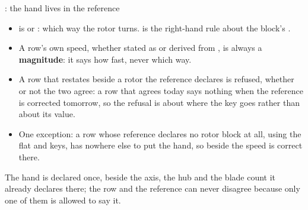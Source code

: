 \begin{frame}{: the hand lives in the reference}
\begin{itemize}\small
  \item {} is  or : which way the rotor
        turns.  is the right-hand rule about the block's
        .
  \item A row's own speed, whether stated as  or derived from
        , is always a \textbf{magnitude}: it says how
        fast, never which way.
  \item A row that restates  beside a rotor the reference
        declares is refused, whether or not the two agree: a row that
        agrees today says nothing when the reference is corrected
        tomorrow, so the refusal is about where the key goes rather than
        about its value.
  \item One exception: a row whose reference declares no rotor block at
        all, using the flat  and 
        keys, has nowhere else to put the hand, so  beside
        the speed is correct there.
\end{itemize}
\begin{ftslimit}
The hand is declared once, beside the axis, the hub and the blade count it
already declares there; the row and the reference can never disagree
because only one of them is allowed to say it.
\end{ftslimit}
\end{frame}

